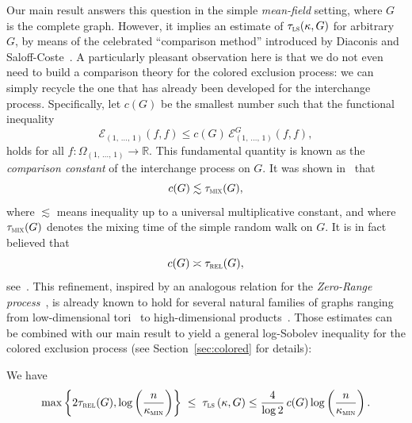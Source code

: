 \documentclass[AHL,Unicode,longabstracts,published]{cedram}
\newcommand{\R}{\mathbb{R}}
\newcommand{\cE}{\mathcal{E}}
\newcommand{\tmix}{\tau_{\textsc{mix}}}
\newcommand{\trel}{\tau_{\textsc{rel}}}
\newcommand{\tls}{\tau_{\textsc{ls}}}
\newcommand{\am}{{\kappa_{\textsc{min}}}}
\begin{document}
Our main result answers this question in the simple \emph{mean-field} setting, where $G$ is the complete graph. However, it implies an estimate of $\tls(\kappa,G)$ for arbitrary $G$, by means of the celebrated ``comparison method'' introduced by Diaconis and Saloff-Coste~\cite{MR1245303,MR1233621}. A particularly pleasant observation here is that we do not even need to build a comparison theory for the colored exclusion process: we can simply recycle the one that has already been developed for the interchange process. Specifically, let $c(G)$ be the smallest number such that the functional inequality
\begin{equation}\label{comp}
\cE_{(1,\,\ldots,\,1)}(f,f) \le c(G)\,\cE_{(1,\,\ldots,\,1)}^G(f,f),
\end{equation}
holds for all $f\colon\Omega_{(1,\,\ldots,\,1)}\to\R$. This fundamental quantity is known as the \emph{comparison constant} of the interchange process on $G$. It was shown in~\cite{2018arXiv181110537A} that
\[
c(G) \lesssim \tmix(G),
\]
where $\lesssim$ means inequality up to a universal multiplicative constant, and where $\tmix(G)$ denotes the mixing time of the simple random walk on $G$. It is in fact believed that
\begin{equation}\label{conj}
c(G) \asymp \trel(G),
\end{equation}
see~\cite[Conjecture~2]{2019arXiv190502146H}. This refinement, inspired by an analogous relation for the \emph{Zero-Range process}~\cite{MR3984254}, is already known to hold for several natural families of graphs ranging from low-dimensional tori~\cite{2018arXiv181110537A} to high-dimensional products~\cite{2019arXiv190502146H}. Those estimates can be combined with our main result to yield a general log-Sobolev inequality for the colored exclusion process (see Section~\ref{sec:colored} for details):

\begin{coro}\label{co:colored}
We have
\[
\max\left\{2\trel(G),\log\left(\frac{n}{\am}\right)\right\} \; \le \; \tls\left(\kappa, G\right) \le \frac{4}{\log 2}\,c(G)\log\left(\frac{n}{\am}\right).
\]
\end{coro}
\end{document}
